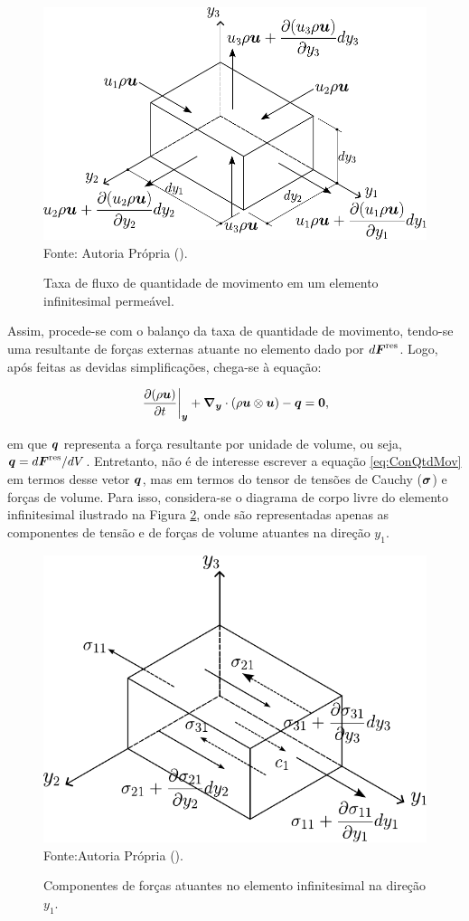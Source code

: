 \begin{figure}[h!]
    \centering
    \caption{Taxa de fluxo de quantidade de movimento em um elemento infinitesimal permeável.}
    \includegraphics[width=.55\linewidth]{Figuras/ConQtdMov.pdf}
    \\Fonte: Autoria Própria (\the\year).
    \label{fig:ConQtdMov}
\end{figure}

Assim, procede-se com o balanço da taxa de quantidade de movimento, tendo-se uma resultante de forças externas atuante no elemento dado por $d\boldsymbol{F}^\mathrm{res}$. Logo, após feitas as devidas simplificações, chega-se à equação:

\begin{equation}
    \left.\frac{\partial{(\rho \boldsymbol{u})}}{\partial{t}}\right|_{\boldsymbol{y}}+\boldsymbol{\nabla_y}\cdot(\rho \boldsymbol{u}\otimes\boldsymbol{u})-\boldsymbol{q}=\boldsymbol{0}\text{,}
    \label{eq:ConQtdMov}
\end{equation}

\noindent em que $\boldsymbol{q}$ representa a força resultante por unidade de volume, ou seja, $\boldsymbol{q}=d\boldsymbol{F}^\mathrm{res}/dV$. Entretanto, não é de interesse escrever a equação \eqref{eq:ConQtdMov} em termos desse vetor $\boldsymbol{q}$, mas em termos do tensor de tensões de Cauchy ($\boldsymbol{\sigma}$) e forças de volume. Para isso, considera-se o diagrama de corpo livre do elemento infinitesimal ilustrado na Figura \ref{fig:EqFor}, onde são representadas apenas as componentes de tensão e de forças de volume atuantes na direção $y_1$.

\begin{figure}[h!]
    \centering
    \caption{Componentes de forças atuantes no elemento infinitesimal na direção $y_1$.}
    \includegraphics[width=.5\linewidth]{Figuras/EqFor.pdf}
    \\Fonte:Autoria Própria (\the\year).
    \label{fig:EqFor}
\end{figure}

